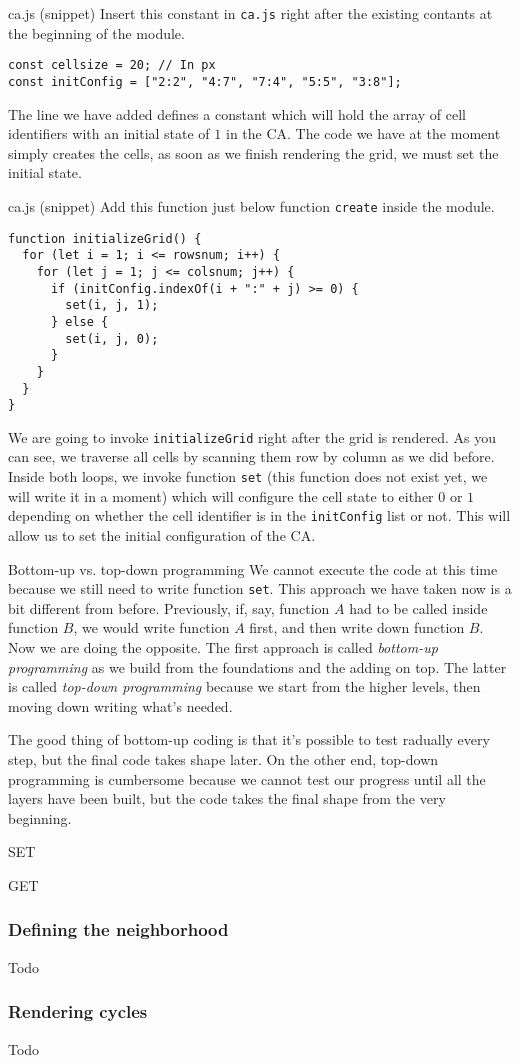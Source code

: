 \begin{programcode}{ca.js (snippet)}
Insert this constant in \texttt{ca.js} right after the existing contants at the beginning of the module.
\begin{verbatim}
const cellsize = 20; // In px
const initConfig = ["2:2", "4:7", "7:4", "5:5", "3:8"];
\end{verbatim}
\end{programcode}

The line we have added defines a constant which will hold the array of cell identifiers with an initial state
of $1$ in the CA. The code we have at the moment simply creates the cells, as soon as we finish rendering the grid,
we must set the initial state.

\begin{programcode}{ca.js (snippet)}
Add this function just below function \texttt{create} inside the module.
\begin{verbatim}
function initializeGrid() {
  for (let i = 1; i <= rowsnum; i++) {
    for (let j = 1; j <= colsnum; j++) {
      if (initConfig.indexOf(i + ":" + j) >= 0) {
        set(i, j, 1);
      } else {
        set(i, j, 0);
      }
    }
  }
}
\end{verbatim}
\end{programcode}

We are going to invoke \texttt{initializeGrid} right after the grid is rendered. As you can see, we traverse
all cells by scanning them row by column as we did before. Inside both loops, we invoke function \texttt{set}
(this function does not exist yet, we will write it in a moment) which will configure the cell state to either
$0$ or $1$ depending on whether the cell identifier is in the \texttt{initConfig} list or not. This will allow us
to set the initial configuration of the CA.

\begin{important}{Bottom-up vs. top-down programming}
We cannot execute the code at this time because we still need to write function \texttt{set}.
This approach we have taken now is a bit different from before. Previously, if, say, function $A$ had to
be called inside function $B$, we would write function $A$ first, and then write down function $B$. Now we are
doing the opposite. The first approach is called \textit{bottom-up programming}
as we build from the foundations and the adding on top.
The latter is called \textit{top-down programming} because we start from the higher levels, then moving down
writing what's needed.

The good thing of bottom-up coding is that it's possible to test radually every step, but the final code takes
shape later. On the other end, top-down programming is cumbersome because we cannot test our progress until
all the layers have been built, but the code takes the final shape from the very beginning.
\end{important}

SET

GET

\subsubsection{Defining the neighborhood}
Todo

\subsubsection{Rendering cycles}
Todo
